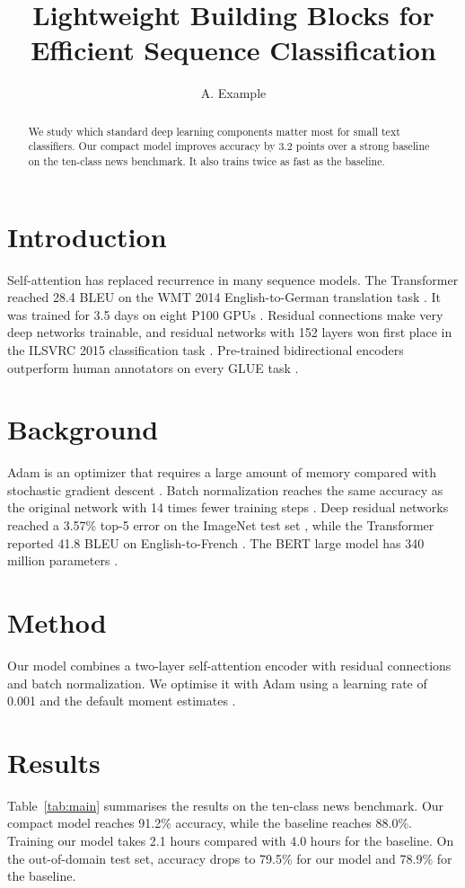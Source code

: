 \documentclass{article}
\title{Lightweight Building Blocks for Efficient Sequence Classification}
\author{A. Example}
\begin{document}
\maketitle

\begin{abstract}
We study which standard deep learning components matter most for small text classifiers.
Our compact model improves accuracy by 3.2 points over a strong baseline on the ten-class news benchmark.
It also trains twice as fast as the baseline.
\end{abstract}

\section{Introduction}
Self-attention has replaced recurrence in many sequence models.
The Transformer reached 28.4 BLEU on the WMT 2014 English-to-German translation task \cite{vaswani2017attention}.
It was trained for 3.5 days on eight P100 GPUs \cite{vaswani2017attention}.
Residual connections make very deep networks trainable, and residual networks with 152 layers won first place in the ILSVRC 2015 classification task \cite{he2016deep}.
Pre-trained bidirectional encoders outperform human annotators on every GLUE task \cite{devlin2019bert}.

\section{Background}
Adam is an optimizer that requires a large amount of memory compared with stochastic gradient descent \cite{kingma2015adam}.
Batch normalization reaches the same accuracy as the original network with 14 times fewer training steps \cite{ioffe2015batch}.
Deep residual networks reached a 3.57\% top-5 error on the ImageNet test set \cite{he2016deep}, while the Transformer reported 41.8 BLEU on English-to-French \cite{vaswani2017attention}.
The BERT large model has 340 million parameters \cite{devlin2019bert}.

\section{Method}
Our model combines a two-layer self-attention encoder with residual connections and batch normalization.
We optimise it with Adam using a learning rate of 0.001 and the default moment estimates \cite{kingma2015adam}.

\section{Results}
Table~\ref{tab:main} summarises the results on the ten-class news benchmark.
Our compact model reaches 91.2\% accuracy, while the baseline reaches 88.0\%.
Training our model takes 2.1 hours compared with 4.0 hours for the baseline.
On the out-of-domain test set, accuracy drops to 79.5\% for our model and 78.9\% for the baseline.
\end{document}
